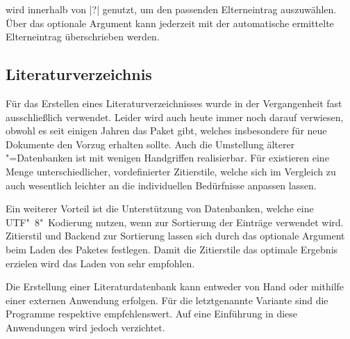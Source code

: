 \documentclass[%
  english,ngerman,%
  cdgeometry=no,DIV=12,%
  cd=false,cdfont=false,cdtitle=true,%
  headings=normal,%
  automark,%
  listof=toc,%
]{tudscrartcl}
\begin{document}
wird innerhalb von |?| genutzt, um den passenden 
Elterneintrag auszuwählen. Über das optionale Argument kann jederzeit mit 
 der automatische ermittelte 
Elterneintrag überschrieben werden.
%
\begin{Hint}
\newcommand*\symbollettergroup{}
\newcommand*{\newformulasymbol}[5][]{%
  \ifisgreeksymbol{#4}{%
    \renewcommand*{\symbollettergroup}{greekletters}%
  }{%
    \renewcommand*{\symbollettergroup}{romanletters}%
  }%
  \newglossaryentry{#2}{%
    type=symbols,%
    name={#3},%
    description={\nopostdesc},%
    symbol={\ensuremath{#4}},%
    user1={\ensuremath{\mathrm{#5}}},%
    sort={#2},%
    parent={\symbollettergroup},%
    #1%
  }%
}
\end{Hint}


\subsection{Literaturverzeichnis}
\label{sec:biblatex}%
%
Für das Erstellen eines Literaturverzeichnisses wurde in der Vergangenheit fast 
ausschließlich  verwendet. Leider wird auch heute immer noch 
darauf verwiesen, obwohl es seit einigen Jahren das Paket  
gibt, welches insbesondere für neue Dokumente den Vorzug erhalten sollte. Auch 
die Umstellung älterer "=Datenbanken ist mit wenigen Handgriffen 
realisierbar. Für  existieren eine Menge unterschiedlicher, 
vordefinierter Zitierstile, welche sich im Vergleich zu  auch 
wesentlich leichter an die individuellen Bedürfnisse anpassen lassen.

Ein weiterer Vorteil ist die Unterstützung von Datenbanken, welche eine 
UTF"~8"~Kodierung nutzen, wenn  zur Sortierung der Einträge 
verwendet wird. Zitierstil und Backend zur Sortierung lassen sich durch das 
optionale Argument beim Laden des Paketes festlegen. Damit die Zitierstile das 
optimale Ergebnis erzielen wird das Laden von  sehr empfohlen.
%
\begin{Preamble}
\usepackage{csquotes}
\usepackage[backend=biber,style=alphabetic]{biblatex}

\end{Preamble}
%
Die Erstellung einer Literaturdatenbank kann entweder von Hand oder mithilfe 
einer externen Anwendung erfolgen. Für die letztgenannte Variante sind die 
Programme  respektive  empfehlenswert. 
Auf eine Einführung in diese Anwendungen wird jedoch verzichtet. 
\end{document}
